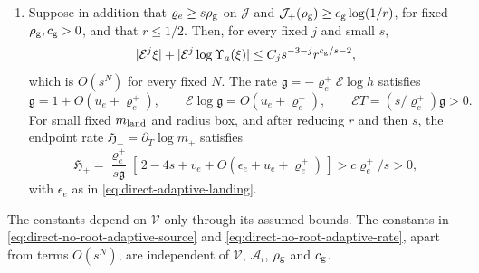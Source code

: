 \begin{lemma}
\begin{enumerate}[label=\textup{(\roman*)}]
\begin{equation}
      \Psi_a(u_e,v_e,\varrho_e,\delta_{\rm an})\e^{-\mathcal J_a(\varrho_e)} .
\end{equation}
Its landing height \(t=m_{\rm land}\varrho_l^2\) satisfies
\(\sqrt t+q_1/\sqrt t+|q_0|/t\le C(\varrho_e+su_e)\), and
\(|q_2|=s\); in particular \eqref{eq:direct-tail-smallness} holds there
for small \(s\).
\item Suppose in addition that \(\varrho_e\ge s\rho_{\rm g}\) on
\(\mathcal J\) and \(\mathcal J_+(\rho_{\rm g})\ge c_{\rm g}\log(1/r)\), for fixed
\(\rho_{\rm g},c_{\rm g}>0\), and that \(r\le1/2\). Then, for every
fixed \(j\) and small \(s\),
\begin{equation}
\label{eq:positive-adaptive-input-weight}
 |\mathcal E^j\xi|+|\mathcal E^j\log\Upsilon_a(\xi)|
       \le C_js^{-3-j}r^{c_{\rm g}/s-2},
\end{equation}
which is \(O(s^N)\) for every fixed \(N\). The rate
\(\mathfrak g=-\varrho_e^+\mathcal E\log h\) satisfies
\begin{equation}
\label{eq:direct-no-root-adaptive-source}
 \mathfrak g=1+O(u_e+\varrho_e^+),\qquad
 \mathcal E\log\mathfrak g=O(u_e+\varrho_e^+),\qquad
 \mathcal ET=(s/\varrho_e^+)\mathfrak g>0 .
\end{equation}
For small fixed \(m_{\rm land}\) and radius box, and after reducing
\(r\) and then \(s\), the endpoint rate
\(\mathfrak H_+=\partial_T\log m_+\) satisfies
\begin{equation}
\label{eq:direct-no-root-adaptive-rate}
 \mathfrak H_+
 =\frac{\varrho_e^+}{s\mathfrak g}
        [\,2-4s+v_e+O(\epsilon_e+u_e+\varrho_e^+)\,]>c\varrho_e^+/s>0,
\end{equation}
with \(\epsilon_e\) as in \eqref{eq:direct-adaptive-landing}.
\end{enumerate}
The constants depend on \(\mathcal V\) only through its assumed bounds.
The constants in \eqref{eq:direct-no-root-adaptive-source} and
\eqref{eq:direct-no-root-adaptive-rate}, apart from terms \(O(s^N)\), are
independent of \(\mathcal V\), \(\mathcal A_i\), \(\rho_{\rm g}\) and
\(c_{\rm g}\).
\end{lemma}

